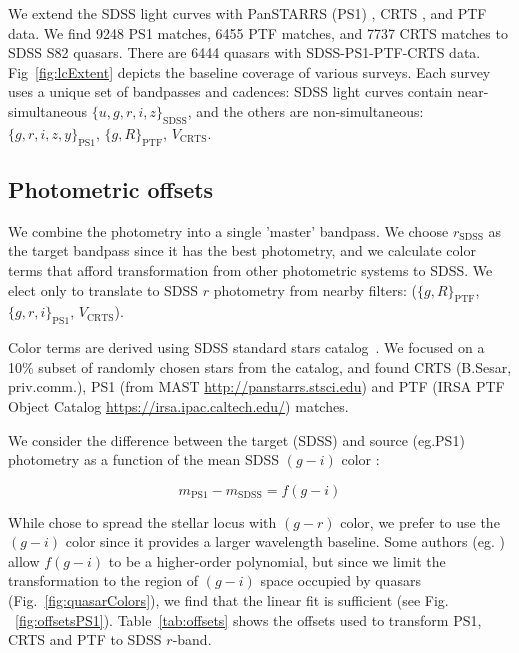 \documentclass[twocolumn]{aastex62}
\begin{document}
We extend the SDSS  light curves with PanSTARRS (PS1) \citep{chambers2011,flewelling2018}, CRTS \citep{drake2009}, and PTF \citep{rau2009} data. We find 9248 PS1 matches, 6455 PTF matches, and 7737 CRTS matches to SDSS S82 quasars. There are  6444 quasars with SDSS-PS1-PTF-CRTS data.  Fig~\ref{fig:lcExtent}  depicts the  baseline coverage of various surveys.  Each survey uses a unique set of bandpasses and cadences: SDSS light curves contain near-simultaneous $\{u,g,r,i,z\}_{\mathrm{SDSS}}$, and the others are  non-simultaneous: $\{g,r,i,z,y\}_{\mathrm{PS1}}$,  $\{g,R\}_{\mathrm{PTF}}$, $V_{\mathrm{CRTS}}$.  

\subsection{Photometric offsets}

We combine the photometry into a single 'master' bandpass. We choose  $r_{\mathrm{SDSS}}$ as the target bandpass since it has the best photometry, and we calculate color terms that afford transformation from other photometric systems to SDSS. We elect only to translate to SDSS $r$ photometry from nearby filters: ($\{g,R\}_{\mathrm{PTF}}$, $\{g,r,i\}_{\mathrm{PS1}}$, $V_{\mathrm{CRTS}}$). 

Color terms are derived using SDSS standard stars catalog~\citep{ivezic2007}.  We focused on a 10\% subset of randomly chosen stars from the catalog, and found CRTS (B.Sesar, priv.comm.), PS1 (from MAST \url{http://panstarrs.stsci.edu}) and PTF (IRSA PTF Object Catalog \url{https://irsa.ipac.caltech.edu/}) matches. 

We consider the difference  between the target (SDSS) and source (eg.PS1) photometry as a function of the mean SDSS $(g-i)$ color : 


\begin{equation}
m_{\mathrm{PS1}} - m_{\mathrm{SDSS}} = f(g-i)
\end{equation}

While \cite{tonry2012} chose to spread the stellar locus with $(g-r)$ color, we prefer to use the $(g-i)$ color since it provides a larger wavelength baseline. Some authors (eg. \citet{li2018}) allow $f(g-i)$ to be a higher-order polynomial, but since we limit the transformation to the  region of $(g-i)$ space occupied by quasars (Fig.~\ref{fig:quasarColors}), we find that the linear fit is sufficient (see Fig. ~\ref{fig:offsetsPS1}). Table~\ref{tab:offsets} shows the offsets used to transform PS1, CRTS and PTF to SDSS $r$-band. 
\end{document}

